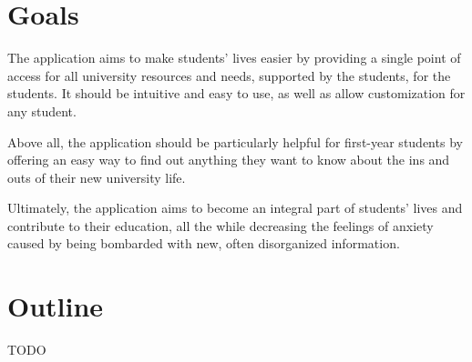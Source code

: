 \section{Goals} \label{1:goals}

    The application aims to make students' lives easier by providing a single point of access for all university resources and needs, supported by the students, for the students. It should be intuitive and easy to use, as well as allow customization for any student.
    
    Above all, the application should be particularly helpful for first-year students by offering an easy way to find out anything they want to know about the ins and outs of their new university life.
    
    Ultimately, the application aims to become an integral part of students' lives and contribute to their education, all the while decreasing the feelings of anxiety caused by being bombarded with new, often disorganized information.

\section{Outline} \label{1:outline}
    TODO